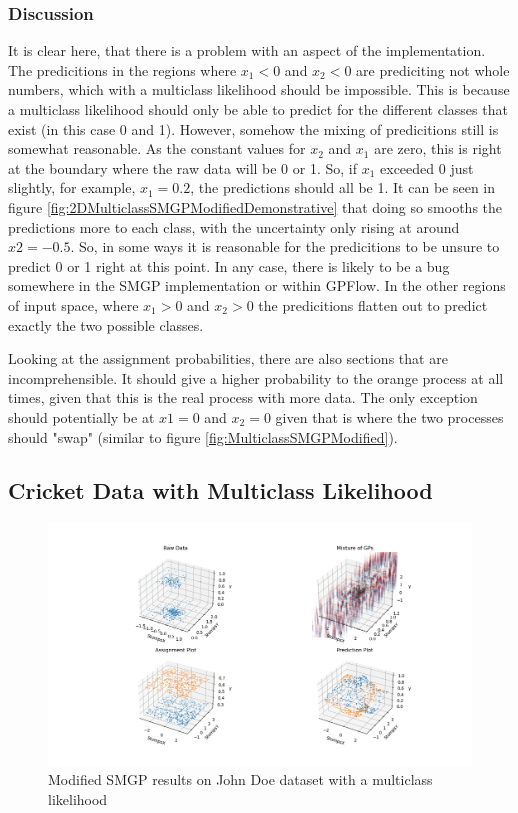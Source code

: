 \documentclass[12pt,a4paper]{report}
\theoremstyle{definition}
\begin{document}
\subsubsection{Discussion}

It is clear here, that there is a problem with an aspect of the implementation.
The predicitions in the regions where $x_{1} < 0$ and $x_{2} < 0$ are prediciting not whole numbers, which with a multiclass likelihood should be impossible.
This is because a multiclass likelihood should only be able to predict for the different classes that exist (in this case 0 and 1).
However, somehow the mixing of predicitions still is somewhat reasonable.
As the constant values for $x_{2}$ and $x_{1}$ are zero, this is right at the boundary where the raw data will be 0 or 1. 
So, if $x_{1}$ exceeded 0 just slightly, for example, $x_{1} = 0.2$, the predictions should all be 1.
It can be seen in figure \ref{fig:2DMulticlassSMGPModifiedDemonstrative} that doing so smooths the predictions more to each class, with the uncertainty only rising at around $x{2} = -0.5$.
So, in some ways it is reasonable for the predicitions to be unsure to predict 0 or 1 right at this point.
In any case, there is likely to be a bug somewhere in the SMGP implementation or within GPFlow.
In the other regions of input space, where $x_{1} > 0$ and $x_{2} > 0$ the predicitions flatten out to predict exactly the two possible classes.

Looking at the assignment probabilities, there are also sections that are incomprehensible.
It should give a higher probability to the orange process at all times, given that this is the real process with more data.
The only exception should potentially be at $x{1} = 0$ and $x_{2} = 0$ given that is where the two processes should "swap" (similar to figure \ref{fig:MulticlassSMGPModified}).

\subsection{Cricket Data with Multiclass Likelihood}

\begin{figure}[H]
    \centering
    \includegraphics[width=\linewidth]{demo_JohnDoe_RightArmSeam_stumpsX_stumpsY_multi_class_1.png}
    \caption{Modified SMGP results on John Doe dataset with a multiclass likelihood}
    \label{fig:CricketMulticlassSMGPModified1}
\end{figure}
\end{document}
